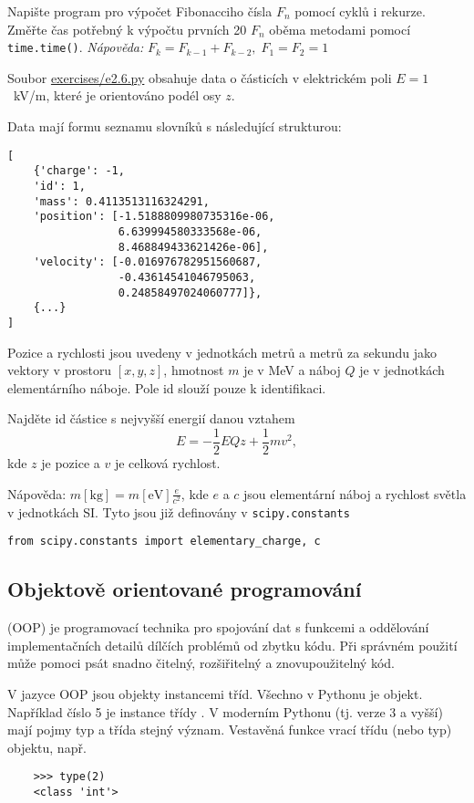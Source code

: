 \begin{exercise}
    Napište program pro výpočet Fibonacciho čísla $F_n$ pomocí cyklů i rekurze. Změřte čas potřebný k výpočtu prvních 20 $F_n$ oběma metodami pomocí \verb|time.time()|.
    \emph{Nápověda:} $F_k = F_{k-1} + F_{k-2},\;F_1 = F_2 = 1$
\end{exercise}

\begin{exercise}
    Soubor \href{https://raw.githubusercontent.com/emil-varga/NOFY080/refs/heads/main/exercises/e2.6.py}{exercises/e2.6.py} obsahuje data o částicích v elektrickém poli $E = 1$~kV/m, které je orientováno podél osy $z$.

    Data mají formu seznamu slovníků s následující strukturou:
\begin{lstlisting}
[
    {'charge': -1,
    'id': 1,
    'mass': 0.4113513116324291,
    'position': [-1.5188809980735316e-06,
                 6.639994580333568e-06,
                 8.468849433621426e-06],
    'velocity': [-0.016976782951560687,
                 -0.43614541046795063,
                 0.24858497024060777]},
    {...}
]
\end{lstlisting}
    Pozice a rychlosti jsou uvedeny v jednotkách metrů a metrů za sekundu jako vektory v prostoru $[x, y, z]$, hmotnost $m$ je v MeV a náboj $Q$ je v jednotkách elementárního náboje. Pole id slouží pouze k identifikaci.

    Najděte id částice s nejvyšší energií danou vztahem
    \[ E = -\frac{1}{2}EQz + \frac{1}{2}m v^2, \]
    kde $z$ je pozice a $v$ je celková rychlost.

    Nápověda: $m\mathrm{[kg]} = m[\mathrm{eV}] \frac{e}{c^2}$, kde $e$ a $c$ jsou elementární náboj a rychlost světla v jednotkách SI. Tyto jsou již definovány v \verb|scipy.constants|
\begin{lstlisting}
from scipy.constants import elementary_charge, c
\end{lstlisting}
\end{exercise}

\subsection{Objektově orientované programování}
    (OOP) je programovací technika pro spojování dat s funkcemi a oddělování implementačních detailů dílčích problémů od zbytku kódu. Při správném použití může pomoci psát snadno čitelný, rozšiřitelný a znovupoužitelný kód.

    V jazyce OOP jsou objekty instancemi tříd. Všechno v Pythonu je objekt. Například číslo 5 je instance třídy . V moderním Pythonu (tj. verze 3 a vyšší) mají pojmy typ a třída stejný význam. Vestavěná funkce  vrací třídu (nebo typ) objektu, např.
\begin{lstlisting}
    >>> type(2)
    <class 'int'>
\end{lstlisting}

